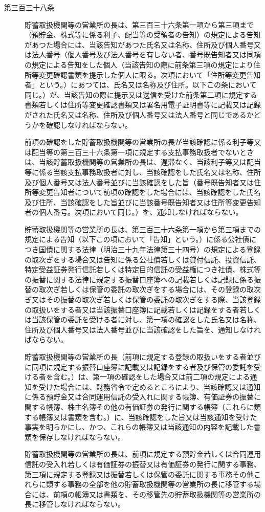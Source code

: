 \documentclass[twocolumn,a4j,10pt]{ltjtarticle}
\begin{document}
\begin{description}
\item[第三百三十八条]貯蓄取扱機関等の営業所の長は、第三百三十六条第一項から第三項まで（預貯金、株式等に係る利子、配当等の受領者の告知）の規定による告知があつた場合には、当該告知があつた氏名又は名称、住所及び個人番号又は法人番号（個人番号及び法人番号を有しない者、番号既告知者又は同項の規定による告知をした個人（当該告知の際に前条第三項の規定により住所等変更確認書類を提示した個人に限る。次項において「住所等変更告知者」という。）にあつては、氏名又は名称及び住所。以下この条において同じ。）が、当該告知の際に提示又は送信を受けた前条第二項に規定する書類若しくは住所等変更確認書類又は署名用電子証明書等に記載又は記録がされた氏名又は名称、住所及び個人番号又は法人番号と同じであるかどうかを確認しなければならない。
\item[]前項の確認をした貯蓄取扱機関等の営業所の長が当該確認に係る利子等又は配当等の第三百三十六条第一項に規定する支払事務取扱者でないときは、当該貯蓄取扱機関等の営業所の長は、遅滞なく、当該利子等又は配当等に係る当該支払事務取扱者に対し、当該確認をした氏名又は名称、住所及び個人番号又は法人番号並びに当該確認をした旨（番号既告知者又は住所等変更告知者について前項の確認をした場合には、当該確認をした氏名及び住所、当該確認をした旨並びに当該番号既告知者又は住所等変更告知者の個人番号。次項において同じ。）を、通知しなければならない。
\item[]貯蓄取扱機関等の営業所の長は、第三百三十六条第一項から第三項までの規定による告知（以下この項において「告知」という。）に係る公社債につき国債に関する法律（明治三十九年法律第三十四号）の規定による登録の取次ぎをする場合又は告知に係る公社債若しくは貸付信託、投資信託、特定受益証券発行信託若しくは特定目的信託の受益権につき社債、株式等の振替に関する法律に規定する振替口座簿への記載若しくは記録に係る振替の取次ぎ若しくは保管の委託の取次ぎをする場合には、その登録の取次ぎ又はその振替の取次ぎ若しくは保管の委託の取次ぎをする際、当該登録の取扱いをする者又は当該振替口座簿に記載若しくは記録をする者若しくは当該保管の委託を受ける者に対し、第一項の確認をした氏名又は名称、住所及び個人番号又は法人番号並びに当該確認をした旨を、通知しなければならない。
\item[]貯蓄取扱機関等の営業所の長（前項に規定する登録の取扱いをする者並びに同項に規定する振替口座簿に記載又は記録をする者及び保管の委託を受ける者を含む。）は、第一項の確認をした場合又は前二項の規定による通知を受けた場合には、財務省令で定めるところにより、当該確認又は通知に係る預貯金又は合同運用信託の受入れに関する帳簿、有価証券の振替に関する帳簿、株主名簿その他の有価証券の発行に関する帳簿（これらに類する帳簿又は書類を含む。）に、当該確認をした旨又は当該通知を受けた事実を明らかにし、かつ、これらの帳簿又は当該通知の内容を記載した書類を保存しなければならない。
\item[]貯蓄取扱機関等の営業所の長は、前項に規定する預貯金若しくは合同運用信託の受入れ若しくは有価証券の振替又は有価証券の発行に関する事務、第三項に規定する登録又は振替若しくは保管の委託に関する事務その他これらに類する事務の全部を他の貯蓄取扱機関等の営業所の長に移管する場合には、前項の帳簿又は書類を、その移管先の貯蓄取扱機関等の営業所の長に移管しなければならない。
\end{description}
\end{document}
